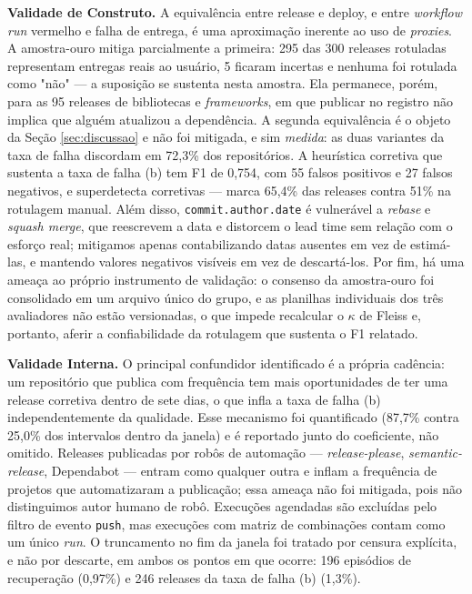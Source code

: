 \documentclass[12pt]{article}
\begin{document}
\textbf{Validade de Construto.} A equivalência entre release e deploy, e entre
\emph{workflow run} vermelho e falha de entrega, é uma aproximação inerente ao uso de
\emph{proxies}. A amostra-ouro mitiga parcialmente a primeira: 295 das 300 releases
rotuladas representam entregas reais ao usuário, 5 ficaram incertas e nenhuma foi rotulada
como "não" --- a suposição se sustenta nesta amostra. Ela permanece, porém, para as 95
releases de bibliotecas e \emph{frameworks}, em que publicar no registro não implica que
alguém atualizou a dependência. A segunda equivalência é o objeto da Seção
\ref{sec:discussao} e não foi mitigada, e sim \emph{medida}: as duas variantes da taxa de falha
discordam em 72,3\% dos repositórios. A heurística corretiva que sustenta a taxa de falha (b) tem
F1 de 0,754, com 55 falsos positivos e 27 falsos negativos, e superdetecta corretivas ---
marca 65,4\% das releases contra 51\% na rotulagem manual. Além disso,
\texttt{commit.author.date} é vulnerável a \emph{rebase} e \emph{squash merge}, que reescrevem
a data e distorcem o lead time sem relação com o esforço real; mitigamos apenas
contabilizando datas ausentes em vez de estimá-las, e mantendo valores negativos visíveis em
vez de descartá-los. Por fim, há uma ameaça ao próprio instrumento de validação: o consenso
da amostra-ouro foi consolidado em um arquivo único do grupo, e as planilhas individuais dos
três avaliadores não estão versionadas, o que impede recalcular o $\kappa$ de Fleiss e,
portanto, aferir a confiabilidade da rotulagem que sustenta o F1 relatado.

\textbf{Validade Interna.} O principal confundidor identificado é a própria cadência: um
repositório que publica com frequência tem mais oportunidades de ter uma release corretiva
dentro de sete dias, o que infla a taxa de falha (b) independentemente da qualidade. Esse mecanismo
foi quantificado (87,7\% contra 25,0\% dos intervalos dentro da janela) e é reportado junto
do coeficiente, não omitido. Releases publicadas por robôs de automação ---
\emph{release-please}, \emph{semantic-release}, Dependabot --- entram como qualquer outra e
inflam a frequência de projetos que automatizaram a publicação; essa ameaça não foi mitigada,
pois não distinguimos autor humano de robô. Execuções agendadas são excluídas pelo filtro de
evento \texttt{push}, mas execuções com matriz de combinações contam como um único
\emph{run}. O truncamento no fim da janela foi tratado por censura explícita, e não por
descarte, em ambos os pontos em que ocorre: 196 episódios de recuperação (0,97\%) e 246
releases da taxa de falha (b) (1,3\%).
\end{document}
